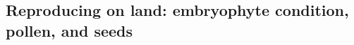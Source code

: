 \begin{frame}[t]
\begin{adjustwidth}{-2em}{-1.5em}
\begin{columns}[t]

        \end{columns}
    \end{adjustwidth}
\end{frame}

\subsection{Reproducing on land: embryophyte condition, pollen, and seeds}

